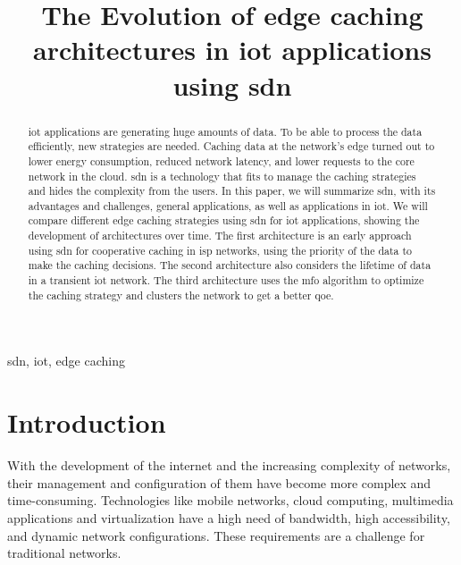 \documentclass[conference]{IEEEtran}
\begin{document}
	\title{The Evolution of edge caching architectures in \acs{iot} applications using \ac{sdn}}

	\author{
		}

	\maketitle

	\begin{abstract}
		\ac{iot} applications are generating huge amounts of data. To be able to process the data efficiently, new strategies are needed. Caching data at the network's edge turned out to lower energy consumption, reduced network latency, and lower requests to the core network in the cloud. \ac{sdn} is a technology that fits to manage the caching strategies and hides the complexity from the users. In this paper, we will summarize \ac{sdn}, with its advantages and challenges, general applications, as well as applications in \ac{iot}. We will compare different edge caching strategies using \ac{sdn} for \ac{iot} applications, showing the development of architectures over time. The first architecture is an early approach using \ac{sdn} for cooperative caching in \ac{isp} networks, using the priority of the data to make the caching decisions. The second architecture also considers the lifetime of data in a transient \ac{iot} network. The third architecture uses the \ac{mfo} algorithm to optimize the caching strategy and clusters the network to get a better \ac{qoe}.
	\end{abstract}

	\begin{IEEEkeywords}
	\ac{sdn}, \ac{iot}, edge caching
	\end{IEEEkeywords}

	\IEEEpeerreviewmaketitle

	\section{Introduction}
	\label{sec:introduction}

	With the development of the internet and the increasing complexity of networks, their management and configuration of them have become more complex and time-consuming. Technologies like mobile networks, cloud computing, multimedia applications and virtualization have a high need of bandwidth, high accessibility, and dynamic network configurations. These requirements are a challenge for traditional networks. \cite{Jefia2018-pj} \cite{MASOUDI20161} 
\end{document}
